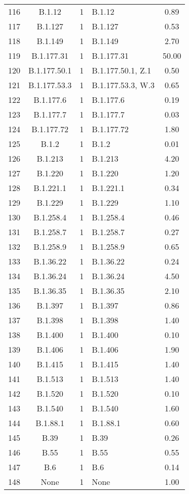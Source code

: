 \begin{longtable}{cccP{4cm}c}
  116 & B.1.12 &   1 & B.1.12 & 0.89 \\ 
  117 & B.1.127 &   1 & B.1.127 & 0.53 \\ 
  118 & B.1.149 &   1 & B.1.149 & 2.70 \\ 
  119 & B.1.177.31 &   1 & B.1.177.31 & 50.00 \\ 
  120 & B.1.177.50.1 &   1 & B.1.177.50.1, Z.1 & 0.50 \\ 
  121 & B.1.177.53.3 &   1 & B.1.177.53.3, W.3 & 0.65 \\ 
  122 & B.1.177.6 &   1 & B.1.177.6 & 0.19 \\ 
  123 & B.1.177.7 &   1 & B.1.177.7 & 0.03 \\ 
  124 & B.1.177.72 &   1 & B.1.177.72 & 1.80 \\ 
  125 & B.1.2 &   1 & B.1.2 & 0.01 \\ 
  126 & B.1.213 &   1 & B.1.213 & 4.20 \\ 
  127 & B.1.220 &   1 & B.1.220 & 1.20 \\ 
  128 & B.1.221.1 &   1 & B.1.221.1 & 0.34 \\ 
  129 & B.1.229 &   1 & B.1.229 & 1.10 \\ 
  130 & B.1.258.4 &   1 & B.1.258.4 & 0.46 \\ 
  131 & B.1.258.7 &   1 & B.1.258.7 & 0.27 \\ 
  132 & B.1.258.9 &   1 & B.1.258.9 & 0.65 \\ 
  133 & B.1.36.22 &   1 & B.1.36.22 & 0.24 \\ 
  134 & B.1.36.24 &   1 & B.1.36.24 & 4.50 \\ 
  135 & B.1.36.35 &   1 & B.1.36.35 & 2.10 \\ 
  136 & B.1.397 &   1 & B.1.397 & 0.86 \\ 
  137 & B.1.398 &   1 & B.1.398 & 1.40 \\ 
  138 & B.1.400 &   1 & B.1.400 & 0.10 \\ 
  139 & B.1.406 &   1 & B.1.406 & 1.90 \\ 
  140 & B.1.415 &   1 & B.1.415 & 1.40 \\ 
  141 & B.1.513 &   1 & B.1.513 & 1.40 \\ 
  142 & B.1.520 &   1 & B.1.520 & 0.10 \\ 
  143 & B.1.540 &   1 & B.1.540 & 1.60 \\ 
  144 & B.1.88.1 &   1 & B.1.88.1 & 0.60 \\ 
  145 & B.39 &   1 & B.39 & 0.26 \\ 
  146 & B.55 &   1 & B.55 & 0.55 \\ 
  147 & B.6 &   1 & B.6 & 0.14 \\ 
  148 & None &   1 & None & 1.00 \\ 
\hline
\end{longtable}
